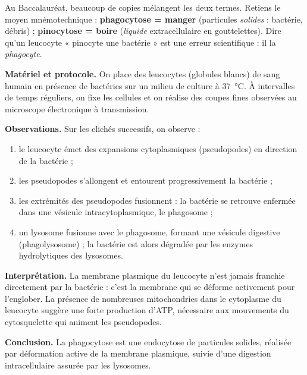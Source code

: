 \documentclass[11pt]{article}
\newcommand{\cle}[1]{{\popxbold\color{popdark}#1}}
\begin{document}
\begin{attention}
Au Baccalauréat, beaucoup de copies mélangent les deux termes. Retiens le moyen mnémotechnique : \textbf{phagocytose = manger} (particules \emph{solides} : bactérie, débris) ; \textbf{pinocytose = boire} (\emph{liquide} extracellulaire en gouttelettes). Dire qu'un leucocyte « pinocyte une bactérie » est une erreur scientifique : il la \emph{phagocyte}.
\end{attention}

\begin{experience}
\textbf{Matériel et protocole.} On place des leucocytes (globules blancs) de sang humain en présence de bactéries sur un milieu de culture à \SI{37}{\celsius}. À intervalles de temps réguliers, on fixe les cellules et on réalise des coupes fines observées au microscope électronique à transmission.

\textbf{Observations.} Sur les clichés successifs, on observe :
\begin{enumerate}
\item le leucocyte émet des expansions cytoplasmiques (pseudopodes) en direction de la bactérie ;
\item les pseudopodes s'allongent et entourent progressivement la bactérie ;
\item les extrémités des pseudopodes fusionnent : la bactérie se retrouve enfermée dans une vésicule intracytoplasmique, le phagosome ;
\item un lysosome fusionne avec le phagosome, formant une \cle{vésicule digestive} (phagolysosome) ; la bactérie est alors dégradée par les enzymes hydrolytiques des lysosomes.
\end{enumerate}

\textbf{Interprétation.} La membrane plasmique du leucocyte n'est jamais franchie directement par la bactérie : c'est la membrane qui se déforme activement pour l'englober. La présence de nombreuses mitochondries dans le cytoplasme du leucocyte suggère une forte production d'ATP, nécessaire aux mouvements du cytosquelette qui animent les pseudopodes.

\textbf{Conclusion.} La phagocytose est une endocytose de particules solides, réalisée par déformation active de la membrane plasmique, suivie d'une digestion intracellulaire assurée par les lysosomes.
\end{experience}
\end{document}
